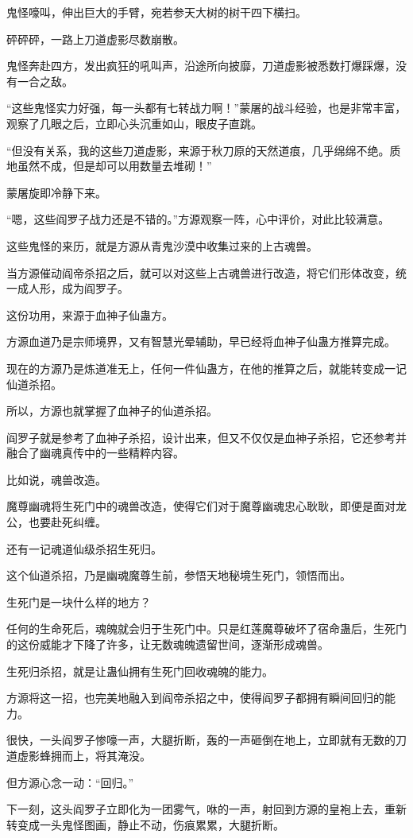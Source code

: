 \begin{this_body}
鬼怪嚎叫，伸出巨大的手臂，宛若参天大树的树干四下横扫。

砰砰砰，一路上刀道虚影尽数崩散。

鬼怪奔赴四方，发出疯狂的吼叫声，沿途所向披靡，刀道虚影被悉数打爆踩爆，没有一合之敌。

“这些鬼怪实力好强，每一头都有七转战力啊！”蒙屠的战斗经验，也是非常丰富，观察了几眼之后，立即心头沉重如山，眼皮子直跳。

“但没有关系，我的这些刀道虚影，来源于秋刀原的天然道痕，几乎绵绵不绝。质地虽然不成，但是却可以用数量去堆砌！”

蒙屠旋即冷静下来。

“嗯，这些阎罗子战力还是不错的。”方源观察一阵，心中评价，对此比较满意。

这些鬼怪的来历，就是方源从青鬼沙漠中收集过来的上古魂兽。

当方源催动阎帝杀招之后，就可以对这些上古魂兽进行改造，将它们形体改变，统一成人形，成为阎罗子。

这份功用，来源于血神子仙蛊方。

方源血道乃是宗师境界，又有智慧光晕辅助，早已经将血神子仙蛊方推算完成。

现在的方源乃是炼道准无上，任何一件仙蛊方，在他的推算之后，就能转变成一记仙道杀招。

所以，方源也就掌握了血神子的仙道杀招。

阎罗子就是参考了血神子杀招，设计出来，但又不仅仅是血神子杀招，它还参考并融合了幽魂真传中的一些精粹内容。

比如说，魂兽改造。

魔尊幽魂将生死门中的魂兽改造，使得它们对于魔尊幽魂忠心耿耿，即便是面对龙公，也要赴死纠缠。

还有一记魂道仙级杀招生死归。

这个仙道杀招，乃是幽魂魔尊生前，参悟天地秘境生死门，领悟而出。

生死门是一块什么样的地方？

任何的生命死后，魂魄就会归于生死门中。只是红莲魔尊破坏了宿命蛊后，生死门的这份威能才下降了许多，让无数魂魄遗留世间，逐渐形成魂兽。

生死归杀招，就是让蛊仙拥有生死门回收魂魄的能力。

方源将这一招，也完美地融入到阎帝杀招之中，使得阎罗子都拥有瞬间回归的能力。

很快，一头阎罗子惨嚎一声，大腿折断，轰的一声砸倒在地上，立即就有无数的刀道虚影蜂拥而上，将其淹没。

但方源心念一动：“回归。”

下一刻，这头阎罗子立即化为一团雾气，咻的一声，射回到方源的皇袍上去，重新转变成一头鬼怪图画，静止不动，伤痕累累，大腿折断。


\end{this_body}
